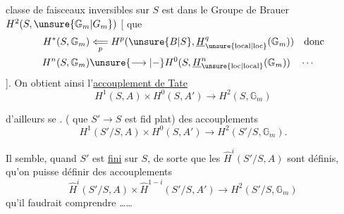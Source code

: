 classe de faisceaux inversibles   sur $S$ est dans le Groupe de Brauer $H^2(S,\unsure{\mathbb G_m|G_m})$ [ que
\[
\begin{aligned}
H^*(S,\mathbb G_m)&\underset{p}{\Longleftarrow} H^p(\unsure{B|S},\underline H^q_{\unsure{\mathrm{local}|\mathrm{loc}}}(\mathbb G_m))\quad\text{donc}\\
H^n(S,\mathbb G_m)&\unsure{\longrightarrow|-} H^0(S,\underline H^n_{\unsure{\mathrm{loc}|\mathrm{local}}}(\mathbb G_m))\quad\cdots
\end{aligned}
\]
]. On obtient ainsi l'\uline{accouplement de Tate}
\[
\boxed{H^1(S,A)\times H^0(S,A')\longrightarrow H^2(S,\mathbb G_m)}
\]

 d'ailleurs se . ( que $S'\longrightarrow S$ est fid plat)  des accouplements
\[
H^1(S'/S,A)\times H^0(S,A')\longrightarrow H^2(S'/S,\mathbb G_m).
\]

Il semble, quand $S'$ est \uline{fini} sur $S$, de sorte que les $\widehat H^i(S'/S,A)$ sont définis, qu'on puisse définir  des accouplements
\[
\widehat H^i(S'/S,A)\times\widehat H^{1-i}(S'/S,A')\longrightarrow H^2(S'/S,\mathbb G_m)
\]
qu'il faudrait comprendre \ldots\ldots
